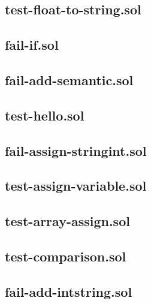 \subsection{test-float-to-string.sol}


\subsection{fail-if.sol}


\subsection{fail-add-semantic.sol}


\subsection{test-hello.sol}


\subsection{fail-assign-stringint.sol}


\subsection{test-assign-variable.sol}


\subsection{test-array-assign.sol}


\subsection{test-comparison.sol}


\subsection{fail-add-intstring.sol}


